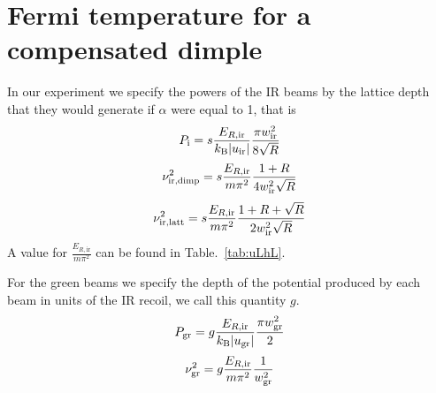 \section{Fermi temperature for a compensated dimple}

In our experiment we specify the powers of the IR beams by the lattice depth
that they would generate if $\alpha$ were equal to 1, that is 
\begin{equation} 
   P_{\text{i}} =  s  \frac{ E_{R,\text{ir}} }{ k_{\text{B}} |u_{\text{ir}}| } 
          \frac{ \pi  w_{\text{ir}}^{2} }{ 8 \sqrt{R}}
\end{equation}
\begin{equation}
 \nu_{\text{ir,dimp}}^{2} 	= s \frac{ E_{R,\text{ir}}  }{m\pi^{2}}
          \frac{ 1+R}{ 4  w_{\text{ir}}^{2}\sqrt{R}} 
\end{equation}
\begin{equation}
 \nu_{\text{ir,latt}}^{2} 	= s \frac{ E_{R,\text{ir}}  }{m\pi^{2}}
          \frac{ 1+R+ \sqrt{R}}{ 2  w_{\text{ir}}^{2}\sqrt{R}} 
\end{equation}
A value for $\frac{E_{R,\text{ir}}}{m\pi^{2}}$ can be found in
Table.~\ref{tab:uLhL}.

For the green beams we specify the depth of the potential produced by each beam
in units of the IR recoil, we call this quantity $g$. 
\begin{equation}
  P_{\text{gr}} = g \frac{E_{R,\text{ir}}}{k_{\text{B}} | u_{\text{gr}} | } 
  \frac{\pi  w_{\text{gr}}^{2}} {2}
\end{equation}
\begin{equation}
  \nu_{\text{gr}}^{2} =  g  
   \frac{ E_{R,\text{ir}}    }{m\pi^{2}}
  \frac{1}{  w_{\text{gr}}^{2}} 
\end{equation}

